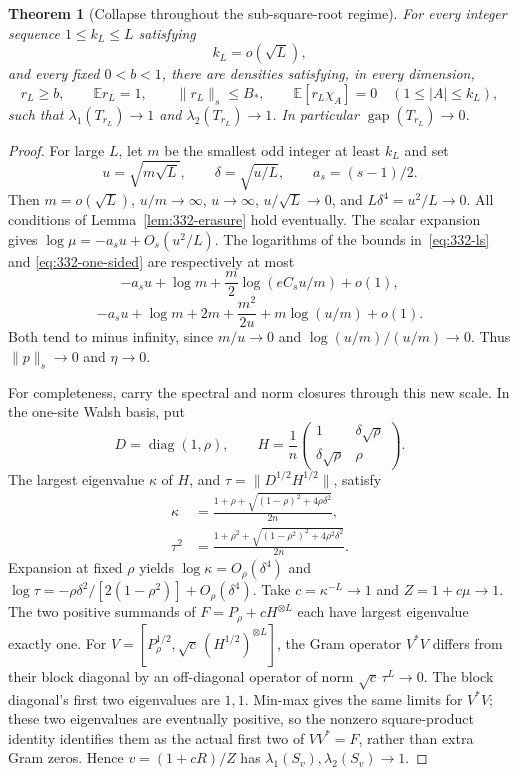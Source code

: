 \documentclass[11pt]{article}
\newtheorem{theorem}{Theorem}
\newcommand{\diag}{\operatorname{diag}}
\newcommand{\gap}{\operatorname{gap}}
\begin{document}
\begin{theorem}[Collapse throughout the sub-square-root regime]
\leavevmode\par
\label{thm:332-subroot}
For every integer sequence $1\le k_L\le L$ satisfying
\[
 k_L=o(\sqrt L),
\]
and every fixed $0<b<1$, there are densities satisfying, in every dimension,
\[
 r_L\ge b,\qquad \mathbb E r_L=1,\qquad \|r_L\|_s\le B_* ,
 \qquad \mathbb E[r_L\chi_A]=0\quad(1\le|A|\le k_L),
\]
such that $\lambda_1(T_{r_L})\to1$ and $\lambda_2(T_{r_L})\to1$.
In particular $\gap(T_{r_L})\to0$.
\end{theorem}
\begin{proof}
For large $L$, let $m$ be the smallest odd integer at least $k_L$ and set
\[
 u=\sqrt{m\sqrt L},\qquad \delta=\sqrt{u/L},\qquad a_s=(s-1)/2.
\]
Then $m=o(\sqrt L)$, $u/m\to\infty$, $u\to\infty$,
$u/\sqrt L\to0$, and $L\delta^4=u^2/L\to0$.
All conditions of Lemma~\ref{lem:332-erasure} hold eventually.
The scalar expansion gives $\log\mu=-a_su+O_s(u^2/L)$.
The logarithms of the bounds in~\eqref{eq:332-ls} and
\eqref{eq:332-one-sided} are respectively at most
\[
 -a_su+\log m+\frac m2\log(eC_su/m)+o(1),
\]
\[
 -a_su+\log m+2m+\frac{m^2}{2u}+m\log(u/m)+o(1).
\]
Both tend to minus infinity, since $m/u\to0$ and
$\log(u/m)/(u/m)\to0$. Thus $\|p\|_s\to0$ and $\eta\to0$.

For completeness, carry the spectral and norm closures through this
new scale. In the one-site Walsh basis, put
\[
 D=\diag(1,\rho),\qquad
 H=\frac1n\begin{pmatrix}1&\delta\sqrt\rho\\
                         \delta\sqrt\rho&\rho\end{pmatrix}.
\]
The largest eigenvalue $\kappa$ of $H$, and
$\tau=\|D^{1/2}H^{1/2}\|$, satisfy
\begin{align}
 \kappa&=\frac{1+\rho+\sqrt{(1-\rho)^2+4\rho\delta^2}}{2n},
       \label{eq:332-kappa}\\
 \tau^2&=\frac{1+\rho^2+\sqrt{(1-\rho^2)^2+4\rho^2\delta^2}}{2n}.
       \label{eq:332-tau}
\end{align}
Expansion at fixed $\rho$ yields
$\log\kappa=O_\rho(\delta^4)$ and
$\log\tau=-\rho\delta^2/[2(1-\rho^2)]+O_\rho(\delta^4)$.
Take $c=\kappa^{-L}\to1$ and $Z=1+c\mu\to1$.
The two positive summands of $F=P_\rho+cH^{\otimes L}$ each have
largest eigenvalue exactly one. For
$V=[P_\rho^{1/2},\sqrt c\,(H^{1/2})^{\otimes L}]$, the Gram operator
$V^*V$ differs from their block diagonal by an off-diagonal operator
of norm $\sqrt c\,\tau^L\to0$. The block diagonal's first two
eigenvalues are $1,1$. Min-max gives the same limits for $V^*V$;
these two eigenvalues are eventually positive, so the nonzero
square-product identity identifies them as the actual first two
of $VV^*=F$, rather than extra Gram zeros. Hence
$v=(1+cR)/Z$ has $\lambda_1(S_v),\lambda_2(S_v)\to1$.


\end{proof}
\end{document}
